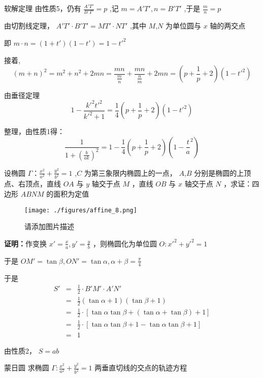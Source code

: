 \begin{corollary}{}
\begin{corollary}{软解定理}
由性质5，仍有 $\displaystyle{\frac{A'T'}{B'T'}=p}$ ,记 $\displaystyle{m=A'T',n=B'T'}$ ,于是 $\displaystyle{\frac{m}{n}=p}$ 

由切割线定理， $\displaystyle{A'T'\cdot B'T'=MT'\cdot NT'}$ ,其中 $\displaystyle{M}$,$\displaystyle{N}$ 为单位圆与 $\displaystyle{x}$ 轴的两交点

即 $\displaystyle{m\cdot n=(1+t')(1-t')=1-t'^2}$ 

接着,
$$(m+n)^2=m^2+n^2+2mn=\frac{mn}{\frac{m}{n}}+\frac{mn}{\frac{n}{m}}+2mn=\left(p+\frac{1}{p}+2\right)(1-t'^2)$$

由垂径定理
$$1-\frac{k'^2t'^2}{k'^2+1}=\frac{1}{4}\left(p+\frac{1}{p}+2\right)(1-t'^2)$$ 

整理，由性质1得：
$$\frac{1}{1+(\frac{b}{ak})^2}=1-\frac{1}{4}\left(p+\frac{1}{p}+2\right)\left(1-\frac{t}{a}^2\right)$$ 

\end{corollary}

\begin{corollary}{}
设椭圆 $\displaystyle{\Gamma：\frac{x^2}{a^2}+\frac{y^2}{b^2}=1}$ ,$\displaystyle{C}$ 为第三象限内椭圆上的一点， $\displaystyle{A}$,$\displaystyle{B}$ 分别是椭圆的上顶点、右顶点，直线 $\displaystyle{OA}$ 与 $\displaystyle{y}$ 轴交于点 $\displaystyle{M}$ ，直线 $\displaystyle{OB}$ 与 $\displaystyle{x}$ 轴交于点 $\displaystyle{N}$ ，求证：四边形 $\displaystyle{ABNM}$ 的面积为定值\begin{figure}[ht]
\centering
\texttt{[image: ./figures/affine\_8.png]}
\caption{请添加图片描述} \label{affine_fig8}
\end{figure}

\textbf{证明：}作变换 $\displaystyle{x'=\frac{x}{a},y'=\frac{y}{b}}$ ，则椭圆化为单位圆 $\displaystyle{O:x'^2+y'^2=1}$

于是 $\displaystyle{OM'=\tan{\beta},ON'=\tan{\alpha},\alpha+\beta=\frac{\pi}{4}}$ 

于是
$$\begin{eqnarray} S'&=&\frac{1}{2}\cdot B'M'\cdot A'N'\\ &=&\frac{1}{2}(\tan\alpha+1)(\tan\beta+1)\\ &=&\frac{1}{2}\cdot\left[\tan\alpha\tan\beta+(\tan\alpha+\tan\beta)+1\right]\\ &=&\frac{1}{2}\cdot[\tan\alpha\tan\beta+1-\tan\alpha\tan\beta+1]\\ &=&1 \end{eqnarray}$$

由性质2， $\displaystyle{S=ab}$ 
\end{corollary}
\begin{corollary}{蒙日圆}
求椭圆 $\displaystyle{\Gamma:\frac{x^2}{a^2}+\frac{y^2}{b^2}=1}$ 两垂直切线的交点的轨迹方程


\end{corollary}
\end{corollary}
